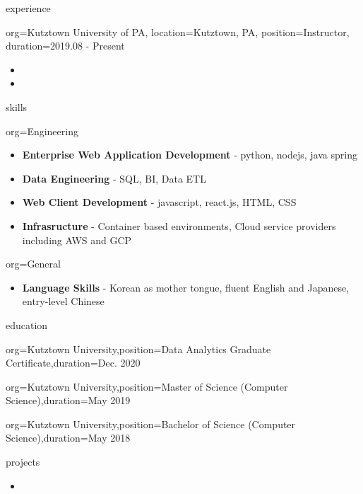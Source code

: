\documentclass{resume}
\begin{document}
\makeheader

\begin{ResumeSection}{experience}
    \begin{ResumeSubsection}{org={Kutztown University of PA}, location={Kutztown, PA}, position={Instructor}, duration=2019.08 - Present}
        \begin{itemize}
            \item \lipsum[1][1-3]
            \item \lipsum[2][1-2]
        \end{itemize}
    \end{ResumeSubsection}    
\end{ResumeSection}

\begin{ResumeSection}{skills}
    \newcommand{\skill}[2]{\textbf{#1} - #2}
    \begin{ResumeSubsection}{org=Engineering}
        \begin{itemize}
            \item \skill{Enterprise Web Application Development}{python, nodejs, java spring}
            \item \skill{Data Engineering}{SQL, BI, Data ETL}
            \item \skill{Web Client Development}{javascript, react.js, HTML, CSS}
            \item \skill{Infrasructure}{Container based environments, Cloud service providers including AWS and GCP}
        \end{itemize}
    \end{ResumeSubsection}
    \begin{ResumeSubsection}{org=General}
        \begin{itemize}
            \item \skill{Language Skills}{Korean as mother tongue, fluent English and Japanese, entry-level Chinese}
        \end{itemize}
    \end{ResumeSubsection}
\end{ResumeSection}

\begin{ResumeSection}{education}
    \begin{ResumeSubsection}{org={Kutztown University},position={Data Analytics Graduate Certificate},duration={Dec. 2020}}
    \end{ResumeSubsection}
    \begin{ResumeSubsection}{org={Kutztown University},position={Master of Science (Computer Science)},duration={May 2019}}        
    \end{ResumeSubsection}
    \begin{ResumeSubsection}{org={Kutztown University},position={Bachelor of Science (Computer Science)},duration={May 2018}}
    \end{ResumeSubsection}
\end{ResumeSection}

\begin{ResumeSection}{projects}
    \begin{itemize}
        \item \lipsum[1][1-2]
    \end{itemize}
\end{ResumeSection}
\end{document}
